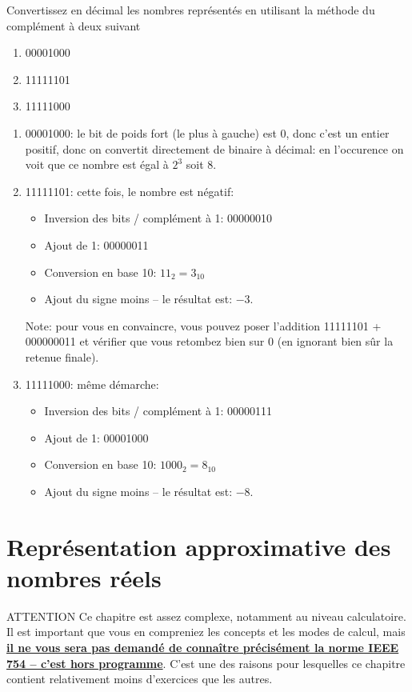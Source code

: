 \documentclass[12pt]{article}
\newenvironment{MaReponse}
		{\begin{greyedtextbox}\itshape} %
		{\end{greyedtextbox}}            %
\newenvironment{alphenum}
{\begin{enumerate}[label=\alph*.]}
	{\end{enumerate}}
\begin{document}
	\begin{MonExo}
		Convertissez en décimal les nombres représentés en utilisant la méthode du complément à deux suivant
		\begin{alphenum}
			\item 00001000
			\item 11111101
			\item 11111000
		\end{alphenum}
	\end{MonExo}
	\begin{MaReponse}
		\begin{alphenum}
			\item 00001000: le bit de poids fort (le plus à gauche) est 0, donc c'est un entier positif, donc on convertit directement de binaire à décimal: en l'occurence on voit que ce nombre est égal à $2^3$ soit 8.
			\item 11111101: cette fois, le nombre est négatif:
			\begin{itemize}
				\item Inversion des bits / complément à 1: 00000010
				\item Ajout de 1: 00000011
				\item Conversion en base 10: $11_2 = 3_{10}$
				\item Ajout du signe moins -- le résultat est: $-3$.
			\end{itemize}
			Note: pour vous en convaincre, vous pouvez poser l'addition 11111101 + 000000011 et vérifier que vous retombez bien sur 0 (en ignorant bien sûr la retenue finale).
			\item 11111000: même démarche:
			\begin{itemize}
				\item Inversion des bits / complément à 1: 00000111
				\item Ajout de 1: 00001000
				\item Conversion en base 10: $1000_2 = 8_{10}$
				\item Ajout du signe moins -- le résultat est: $-8$.
			\end{itemize}
		\end{alphenum}
	\end{MaReponse}
	
	\pagebreak
	
	\section{Représentation approximative des nombres réels}
	\begin{MonAmp}{ATTENTION}
		Ce chapitre est assez complexe, notamment au niveau calculatoire. Il est important que vous en compreniez les concepts et les modes de calcul, mais \textbf{\uline{il ne vous sera pas demandé de connaître précisément la norme IEEE 754 -- c'est hors programme}}. C'est une des raisons pour lesquelles ce chapitre contient relativement moins d'exercices que les autres.
	\end{MonAmp}
	
\end{document}
